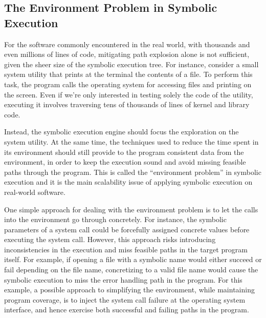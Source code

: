\subsection{The Environment Problem in Symbolic Execution}


For the software commonly encountered in the real world, with thousands and even millions of lines of code, mitigating path explosion alone is not sufficient, given the sheer size of the symbolic execution tree.
%
For instance, consider a small system utility that prints at the terminal the contents of a file.  To perform this task, the program calls the operating system for accessing files and printing on the screen.
%
Even if we're only interested in testing solely the code of the utility, executing it involves traversing tens of thousands of lines of kernel and library code.

Instead, the symbolic execution engine should focus the exploration on the system utility.  At the same time, the techniques used to reduce the time spent in its environment should still provide to the program consistent data from the environment, in order to keep the execution sound and avoid missing feasible paths through the program.
%
This is called the ``environment problem'' in symbolic execution and it is the main scalability issue of applying symbolic execution on real-world software.

One simple approach for dealing with the environment problem is to let the calls into the environment go through concretely.  For instance, the symbolic parameters of a system call could be forcefully assigned concrete values before executing the system call.
%
However, this approach risks introducing inconsistencies in the execution and miss feasible paths in the target program itself.
%
For example, if opening a file with a symbolic name would either succeed or fail depending on the file name, concretizing to a valid file name would cause the symbolic execution to miss the error handling path in the program.
%
For this example, a possible approach to simplifying the environment, while maintaining program coverage, is to inject the system call failure at the operating system interface, and hence exercise both successful and failing paths in the program.

\newcommand{\cnineccolor}{\cellcolor{GreenYellow}}
\newcommand{\chefccolor}{\cellcolor{SkyBlue}}


